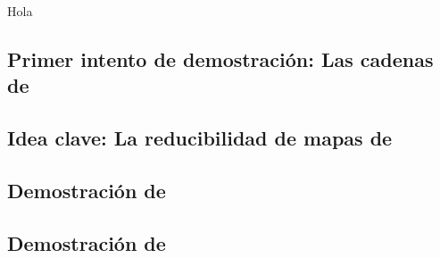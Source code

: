 \documentclass[spanish,utf8]{beamer}
\begin{document}
\begin{frame}[t]
Hola
\end{frame}


\subsection{Primer intento de demostración: Las cadenas de \citeauthor{kempe}}

\subsection{Idea clave: La reducibilidad de mapas de \citeauthor{birkhoff}}

\subsection{Demostración de \citeauthor{appel}}

\subsection{Demostración de \citeauthor{robertson}}

\end{document}
